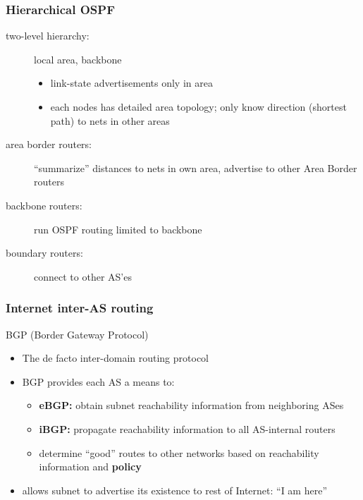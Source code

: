 \subsubsection{Hierarchical OSPF}
\begin{description}
	\item[two-level hierarchy:] local area, backbone
	\begin{itemize}
		\item link-state advertisements only in area
		\item each nodes has detailed area topology; only know direction (shortest path) to nets in other areas
	\end{itemize}
	\item[area border routers:] ``summarize'' distances to nets in own area, advertise to other Area Border routers
	\item[backbone routers:] run OSPF routing limited to backbone
	\item[boundary routers:] connect to other AS'es
\end{description}
\subsubsection{Internet inter-AS routing}
\begin{note}{BGP (Border Gateway Protocol)}
	\begin{itemize}
		\item The de facto inter-domain routing protocol
		\item BGP provides each AS a means to:
		\begin{itemize}
			\item \textbf{eBGP:} obtain subnet reachability information from neighboring ASes
			\item \textbf{iBGP:} propagate reachability information to all AS-internal routers
			\item determine ``good'' routes to other networks based on reachability information and \textbf{policy}
		\end{itemize}
		\item allows subnet to advertise its existence to rest of Internet: ``I am here''
	\end{itemize}
\end{note}

